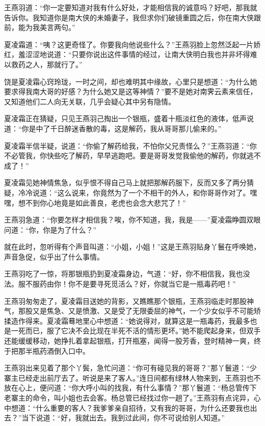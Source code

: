 \documentclass[12pt,oneside]{book}
\begin{document}
王燕羽道：``你一定要知道对我有什么好处，才能相信我的诚意吗？好吧，那我就告诉你。我知道你是南大侠的未婚妻子，我但求你们破镜重圆之后，你在南大侠跟前，能为我美言两句。''

夏凌霜道：``咦？这更奇怪了。你要我向他说些什么？''王燕羽脸上忽然泛起一片娇红，羞涩涩地说道：``只要你说出这件事情的经过，让南大侠明白我也并非坏得难以救药之人，那就行了。''

饶是夏凌霜心窍玲珑，一时之间，却也难明其中缘故，心里只是想道：``为什么她要求得我南大哥的好感？为什么她又是这等神情？''要不是她对南霁云素来信任，又知道他们二人向无关联，几乎会疑心其中另有隐情。

夏凌霜正在猜疑，只见王燕羽己掏出一个银瓶，盛着十瓶淡红色的液体，低声说道：``你是中了千日醉迷香散的毒，这是解药，我从哥哥那儿偷来的。''

夏凌霜半信半疑，说道：``你偷了解药给我，不怕你父兄责怪么？''王燕羽道：``你不必管我，你快些吃了解药，早早逃跑吧。要是哥哥发觉我偷他的解药，你就逃不成了！''

夏凌霜见她神情焦急，似乎恨不得自己马上就把那解药服下，反而又多了两分猜疑，冷冷说道：``这么说来，你竟然为了一个不相干的外人，和你哥哥作对了。嘿嘿，想不到你心地竟是如此善良，老虎也会念大悲咒了！''

王燕羽急道：``你要怎样才相信我？唉，你不知道，我，我是------''夏凌霜睁圆双眼问道：``你，你是为了什么？''

就在此时，忽听得有个声音叫道：``小姐，小姐！''这是王燕羽贴身丫鬟在呼唤她，声音急促，似乎出了什么事情。

王燕羽吃了一惊，将那银瓶扔到夏凌霜身边，气道：``好，你不相信我，我也没法。服不服药由你！你不是要寻死觅活么？好，你就当它是一瓶毒药吧！''

王燕羽匆匆走了，夏凌霜目送她的背影，又瞧瞧那个银瓶，王燕羽临走时那股神气，那股又是焦急、又是愤激、又是受了无限委屈的神气，一个少女似乎不可能矫揉造作得来。夏凌霜蓦地里心中想道：``她说得对，就算这是一瓶毒药，我最多也是一死而已，服了它决不会比现在半死不活的情形更坏。''她不能爬起身来，但双手还能缓缓移动，她挣扎着拿起银瓶，打开瓶塞，闻得一股芳香，登时精神一爽，终于把那半瓶药酒倒入口中。

王燕羽出来见着了那个丫鬓，急忙问道：``你可有碰见我的哥哥？''那丫鬟道：``少寨主已经走出前厅去了。听说是来了客人。''连日间都有绿林人物来到，王燕羽也不放在心上，便问道：``你大呼小叫的找我，有什么事情？''那丫鬟道：``杨总管传下老寨主的命令，叫小姐也去会客。杨总管已经找过你一趟了。''王燕羽有点诧异，心中想道：``什么重要的客人？我爹爹亲自招待，又有我的哥哥，为什么还要我也出去？''当下说道：``好，我就出去。我到过此间，你不可说给别人知道。''
\end{document}
